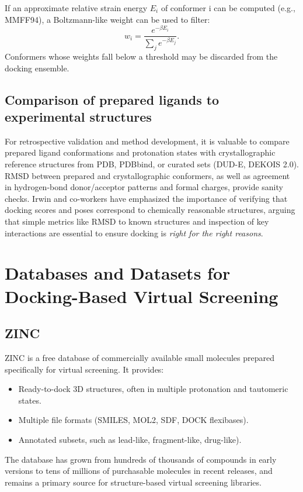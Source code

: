 \documentclass[12pt, a4paper]{article}
\begin{document}
If an approximate relative strain energy $E_i$ of conformer i can be computed (e.g., MMFF94), a Boltzmann-like weight can be used to filter:
\[
w_i = \frac{e^{-\beta E_i}}{\sum_j e^{-\beta E_j}}.
\]
Conformers whose weights fall below a threshold may be discarded from the docking ensemble.

\subsection{Comparison of prepared ligands to experimental structures}

For retrospective validation and method development, it is valuable to compare prepared ligand conformations and protonation states with crystallographic reference structures from PDB, PDBbind, or curated sets (DUD-E, DEKOIS 2.0). RMSD between prepared and crystallographic conformers, as well as agreement in hydrogen-bond donor/acceptor patterns and formal charges, provide sanity checks.\cite{CH6_Hawkins2010,CH6_WangPDBbind} Irwin and co-workers have emphasized the importance of verifying that docking scores and poses correspond to chemically reasonable structures, arguing that simple metrics like RMSD to known structures and inspection of key interactions are essential to ensure docking is \emph{right for the right reasons}. \cite{CH6_Irwin2005}

\section{Databases and Datasets for Docking-Based Virtual Screening}

\subsection{ZINC}

ZINC is a free database of commercially available small molecules prepared specifically for virtual screening.\cite{CH6_Irwin2005} It provides:
\begin{itemize}
  \item Ready-to-dock 3D structures, often in multiple protonation and tautomeric states.
  \item Multiple file formats (SMILES, MOL2, SDF, DOCK flexibases).
  \item Annotated subsets, such as lead-like, fragment-like, drug-like).
\end{itemize}

The database has grown from hundreds of thousands of compounds in early versions to tens of millions of purchasable molecules in recent releases, and remains a primary source for structure-based virtual screening libraries\cite{CH6_Irwin2005}.
\end{document}
